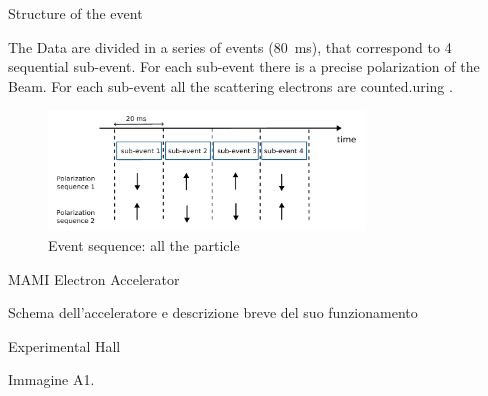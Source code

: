 \documentclass[9pt,a4paper]{beamer}
\begin{document}
\begin{frame}{Structure of the event}

The Data are divided in a series of events (\SI{80}{\milli \second}), that correspond to 4 sequential sub-event. For each sub-event there is a precise polarization of the Beam. For each sub-event all the scattering electrons are counted.uring . 

\begin{figure}[hbtp]
\centering
\includegraphics[width = 0.75\textwidth]{figures/EventStructure.pdf}
\caption{Event sequence: all the particle}
\end{figure}

\end{frame}

\begin{frame}{MAMI Electron Accelerator}

Schema dell'acceleratore e descrizione breve del suo funzionamento

\end{frame}

\begin{frame}{Experimental Hall}

Immagine A1.

\end{frame}

\end{document}
